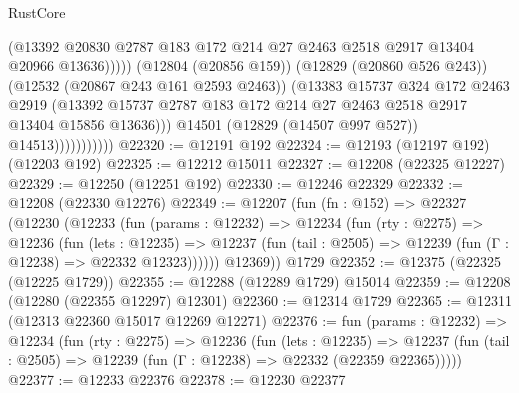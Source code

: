 \begin{lexlean}{RustCore}
\begin{coremodule}
                                    (@13392
                                      @20830
                                      @2787
                                      @183
                                      @172
                                      @214
                                      @27
                                      @2463
                                      @2518
                                      @2917
                                      @13404
                                      @20966
                                      @13636)))))
                            (@12804 (@20856 @159))
                            (@12829 (@20860 @526 @243))
                            (@12532 (@20867 @243 @161 @2593 @2463))
                            (@13383
                              @15737
                              @324
                              @172
                              @2463
                              @2919
                              (@13392
                                @15737
                                @2787
                                @183
                                @172
                                @214
                                @27
                                @2463
                                @2518
                                @2917
                                @13404
                                @15856
                                @13636)))
                          @14501
                          (@12829 (@14507 @997 @527))
                          @14513)))))))))))
@22320 := @12191 @192
@22324 := @12193 (@12197 @192) (@12203 @192)
@22325 := @12212 @15011
@22327 := @12208 (@22325 @12227)
@22329 := @12250 (@12251 @192)
@22330 := @12246 @22329
@22332 := @12208 (@22330 @12276)
@22349 := @12207
    (fun (fn : @152) =>
    @22327
      (@12230
        (@12233
          (fun (params : @12232) =>
          @12234
            (fun (rty : @2275) =>
            @12236
              (fun (lets : @12235) =>
              @12237 (fun (tail : @2505) => @12239 (fun (Γ : @12238) => @22332 @12323))))))
        @12369))
    @1729
@22352 := @12375 (@22325 (@12225 @1729))
@22355 := @12288 (@12289 @1729) @15014
@22359 := @12208 (@12280 (@22355 @12297) @12301)
@22360 := @12314 @1729
@22365 := @12311 (@12313 @22360 @15017 @12269 @12271)
@22376 := fun (params : @12232) =>
  @12234
    (fun (rty : @2275) =>
    @12236
      (fun (lets : @12235) =>
      @12237 (fun (tail : @2505) => @12239 (fun (Γ : @12238) => @22332 (@22359 @22365)))))
@22377 := @12233 @22376
@22378 := @12230 @22377

\end{coremodule}
\end{lexlean}
